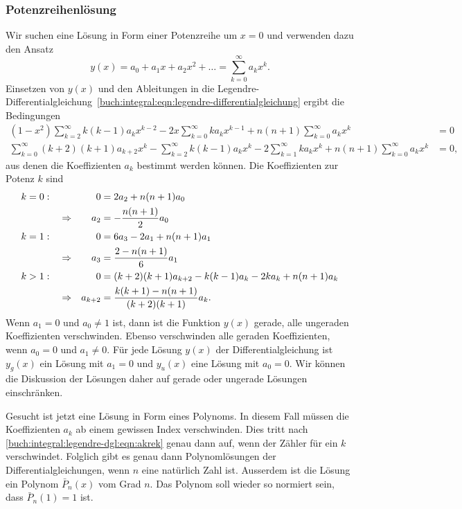 %
%
\subsubsection{Potenzreihenlösung}
Wir suchen eine Lösung in Form einer Potenzreihe um $x=0$ und 
verwenden dazu den Ansatz
\[
y(x) = a_0+a_1x+a_2x^2+ \dots = \sum_{k=0}^\infty a_kx^k.
\]
Einsetzen von $y(x)$ und den Ableitungen in die
Legendre-Differentialgleichung~\eqref{buch:integral:eqn:legendre-differentialgleichung}
ergibt die Bedingungen
\begin{align*}
(1-x^2) \sum_{k=2}^\infty k(k-1)a_kx^{k-2}
-2x\sum_{k=0}^\infty ka_kx^{k-1}
+
n(n+1)\sum_{k=0}^\infty  a_kx^k
&=
0
\\
\sum_{k=0}^\infty (k+2)(k+1)a_{k+2}x^k
-
\sum_{k=2}^\infty k(k-1)a_kx^k
-
2\sum_{k=1}^\infty ka_kx^k
+
n(n+1)\sum_{k=0}^\infty  a_kx^k
&=
0,
\end{align*}
aus denen die Koeffizienten $a_k$ bestimmt werden können.
Die Koeffizienten zur Potenz $k$ sind 
\begin{align}
k&=0:
&
&&
0&=
2a_2+n(n+1)a_0
\notag
\\
&&
&\Rightarrow&
a_2&=-\frac{n(n+1)}{2}a_0
\notag
\\
k&=1:
&
&&
0&=
6a_3-2a_1+n(n+1)a_1
\notag
\\
&&
&\Rightarrow&
a_3&= \frac{2-n(n+1)}{6}a_1
\notag
\\
k&>1:
&
&&
0&=
(k+2)(k+1)a_{k+2} -k(k-1)a_k -2ka_k +n(n+1) a_k
\notag
\\
&&
&\Rightarrow&
a_{k+2}
&=
\frac{ k(k+1)-n(n+1) }{(k+2)(k+1)}
a_k.
\label{buch:integral:legendre-dgl:eqn:akrek}
\end{align}
Wenn $a_1=0$ und $a_0\ne 1$ ist, dann ist die Funktion $y(x)$ gerade,
alle ungeraden Koeffizienten verschwinden.
Ebenso verschwinden alle geraden Koeffizienten, wenn $a_0=0$ und $a_1\ne 0$.
Für jede Lösung $y(x)$ der Differentialgleichung ist
$y_g(x)$ ein Lösung mit $a_1=0$ und $y_u(x)$ eine Lösung mit $a_0=0$.
Wir können die Diskussion der Lösungen daher auf gerade oder ungerade
Lösungen einschränken.

Gesucht ist jetzt eine Lösung in Form eines Polynoms.
In diesem Fall müssen die Koeffizienten $a_k$ ab einem
gewissen Index verschwinden.
Dies tritt nach \eqref{buch:integral:legendre-dgl:eqn:akrek} genau
dann auf, wenn der Zähler für ein $k$ verschwindet.
Folglich gibt es genau dann Polynomlösungen der Differentialgleichungen,
wenn $n$ eine natürlich Zahl ist.
Ausserdem ist die Lösung ein Polynom $\bar{P}_n(x)$ vom Grad $n$.
Das Polynom soll wieder so normiert sein, dass $\bar{P}_n(1)=1$ ist.


